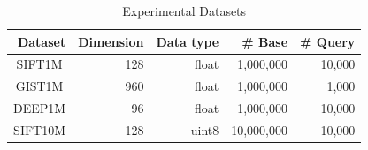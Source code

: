 \begin{table}[ht] 
  \caption{Experimental Datasets} \label{tab::dataset}
  \centering
  \small
  \renewcommand{\arraystretch}{1.5}
  \setlength{\tabcolsep}{6mm}
  \begin{tabular}{crrrr}
  \hline
  \multicolumn{1}{r}{\textbf{Dataset}} & \textbf{Dimension} & \textbf{Data type} & \textbf{\# Base} & \textbf{\# Query} \\ \hline
  SIFT1M                        & 128                & float             & 1,000,000       & 10,000           \\ 
  GIST1M                        & 960                & float             & 1,000,000       & 1,000            \\ 
  DEEP1M                        & 96                 & float             & 1,000,000       & 10,000           \\ 
  SIFT10M                       & 128                & uint8             & 10,000,000      & 10,000           \\ \hline
  \end{tabular}
\end{table}
